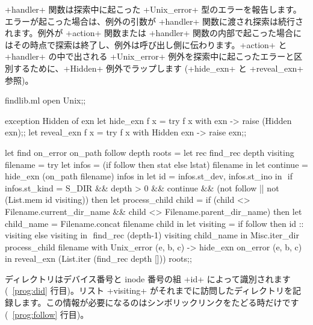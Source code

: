 \ml+handler+ 関数は探索中に起こった \ml+Unix_error+ 型のエラーを報告します。エラーが起こった場合は、例外の引数が \ml+handler+ 関数に渡され探索は続行されます。例外が \ml+action+ 関数または \ml+handler+ 関数の内部で起こった場合にはその時点で探索は終了し、例外は呼び出し側に伝わります。\ml+action+ と \ml+handler+ の中で出される \ml+Unix_error+ 例外を探索中に起こったエラーと区別するために、\ml+Hidden+ 例外でラップします (\ml+hide_exn+ と \ml+reveal_exn+ 参照)。
%
\begin{listingcodefile}[style=numbers]{findlib.ml}
open Unix;;

exception Hidden of exn
let hide_exn f x = try f x with exn -> raise (Hidden exn);;
let reveal_exn f x = try f x with Hidden exn -> raise exn;;

let find on_error on_path follow depth roots =
  let rec find_rec depth visiting filename =
    try
      let infos = (if follow then stat else lstat) filename in
      let continue = hide_exn (on_path filename) infos in
      let id = infos.st_dev, infos.st_ino in $\label{prog:did}$
      if infos.st_kind = S_DIR && depth > 0 && continue &&
        (not follow || not (List.mem id visiting))
      then
        let process_child child =
          if (child <> Filename.current_dir_name &&
              child <> Filename.parent_dir_name) then
            let child_name = Filename.concat filename child in
            let visiting =
              if follow then id :: visiting else visiting in $\label{prog:follow}$
            find_rec (depth-1) visiting child_name in
        Misc.iter_dir process_child filename
    with Unix_error (e, b, c) -> hide_exn on_error (e, b, c) in
  reveal_exn (List.iter (find_rec depth [])) roots;;
\end{listingcodefile}

ディレクトリはデバイス番号と inode 番号の組 \ml+id+ によって識別されます (~\ref{prog:did} 行目)。リスト \ml+visiting+ がそれまでに訪問したディレクトリを記録します。この情報が必要になるのはシンボリックリンクをたどる時だけです (~\ref{prog:follow} 行目)。

